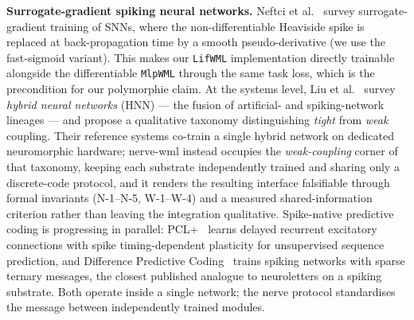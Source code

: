 \documentclass[10pt,twocolumn]{article}
\begin{document}
\textbf{Surrogate-gradient spiking neural networks.} Neftci et al.~\cite{neftci2019surrogate} survey surrogate-gradient training of SNNs, where the non-differentiable Heaviside spike is replaced at back-propagation time by a smooth pseudo-derivative (we use the fast-sigmoid variant). This makes our \texttt{LifWML} implementation directly trainable alongside the differentiable \texttt{MlpWML} through the same task loss, which is the precondition for our polymorphie claim. At the systems level, Liu et al.~\cite{liu2024hybrid} survey \emph{hybrid neural networks} (HNN) --- the fusion of artificial- and spiking-network lineages --- and propose a qualitative taxonomy distinguishing \emph{tight} from \emph{weak} coupling. Their reference systems co-train a single hybrid network on dedicated neuromorphic hardware; nerve-wml instead occupies the \emph{weak-coupling} corner of that taxonomy, keeping each substrate independently trained and sharing only a discrete-code protocol, and it renders the resulting interface falsifiable through formal invariants (N-1--N-5, W-1--W-4) and a measured shared-information criterion rather than leaving the integration qualitative. Spike-native predictive coding is progressing in parallel: PCL+~\cite{ndri2026pclplus} learns delayed recurrent excitatory connections with spike timing-dependent plasticity for unsupervised sequence prediction, and Difference Predictive Coding~\cite{karlsson2026diffpc} trains spiking networks with sparse ternary messages, the closest published analogue to neuroletters on a spiking substrate. Both operate inside a single network; the nerve protocol standardises the message between independently trained modules.
\end{document}
